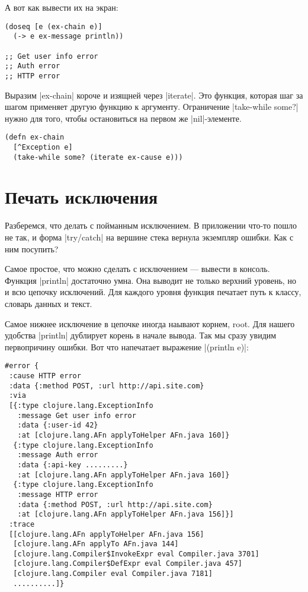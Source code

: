 А вот как вывести их на экран:

\begin{verbatim}
(doseq [e (ex-chain e)]
  (-> e ex-message println))

;; Get user info error
;; Auth error
;; HTTP error
\end{verbatim}

Выразим \spverb|ex-chain| короче и изящней через \spverb|iterate|. Это функция, которая шаг за
шагом применяет другую функцию к аргументу. Ограничение \spverb|take-while some?| нужно
для того, чтобы остановиться на первом же \spverb|nil|-элементе.

\begin{verbatim}
(defn ex-chain
  [^Exception e]
  (take-while some? (iterate ex-cause e)))
\end{verbatim}

\section{Печать исключения}

Разберемся, что делать с пойманным исключением. В приложении что-то пошло не
так, и форма \spverb|try/catch| на вершине стека вернула экземпляр ошибки. Как с ним
посупить?

Самое простое, что можно сделать с исключением — вывести в консоль. Функция
\spverb|println| достаточно умна. Она выводит не только верхний уровень, но и всю
цепочку исключений. Для каждого уровня функция печатает путь к классу, словарь
данных и текст.

Самое нижнее исключение в цепочке иногда наывают корнем, root. Для нашего
удобства \spverb|println| дублирует корень в начале вывода. Так мы сразу увидим
первопричину ошибки. Вот что напечатает выражение \spverb|(println e)|:

\begin{verbatim}
#error {
 :cause HTTP error
 :data {:method POST, :url http://api.site.com}
 :via
 [{:type clojure.lang.ExceptionInfo
   :message Get user info error
   :data {:user-id 42}
   :at [clojure.lang.AFn applyToHelper AFn.java 160]}
  {:type clojure.lang.ExceptionInfo
   :message Auth error
   :data {:api-key .........}
   :at [clojure.lang.AFn applyToHelper AFn.java 160]}
  {:type clojure.lang.ExceptionInfo
   :message HTTP error
   :data {:method POST, :url http://api.site.com}
   :at [clojure.lang.AFn applyToHelper AFn.java 156]}]
 :trace
 [[clojure.lang.AFn applyToHelper AFn.java 156]
  [clojure.lang.AFn applyTo AFn.java 144]
  [clojure.lang.Compiler$InvokeExpr eval Compiler.java 3701]
  [clojure.lang.Compiler$DefExpr eval Compiler.java 457]
  [clojure.lang.Compiler eval Compiler.java 7181]
  ..........]}
\end{verbatim}

